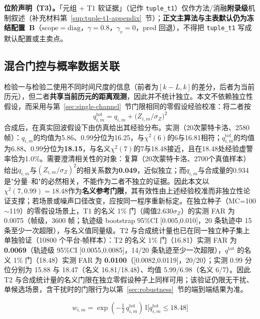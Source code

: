 \documentclass[UTF8,a4paper,zihao=-4]{ctexart}
\begin{document}
\noindent\textbf{位阶声明（T3）。}\quad 「元组 + T1 软证据」（记作 \texttt{tuple\_t1}）仅作方法/消融\textbf{附录级}机制叙述（补充材料第~\ref{sup:tuple-t1-appendix}~节）；\textbf{正文主算法与主表默认仍为冻结配置~B}（$\mathrm{scope}=\mathrm{diag}$，$\gamma=0.8$，$\gamma_v=0$，pred 回退），不得把 \texttt{tuple\_t1} 写成默认配置或主卖点。


\subsection{混合门控与概率数据关联}\label{sec:pda}
检验一与检验二使用不同时间尺度的信息（前者为\([k-L,k]\)的差分，后者为当前历元），但二者\textbf{共享当前历元的距离观测}，因此并不统计独立。本文不依赖独立性假设，而采用与第~\ref{sec:single-channel}~节门限相同的零假设经验校准：将二者按
\begin{equation}
q^{\mathrm{tot}}_{i,m}=q_{i,m}+\bigl(Z_{i,m}/\sigma_Z\bigr)^2
\label{eq:t2-total}
\end{equation}
合成后，在真实回波假设下由仿真给出其经验分布。实测（20次蒙特卡洛、2580帧）：\(q_{i,m}\)的均值为5.86、0.99分位为16.25，与\(\chi^2(6)\)的6与16.81相符；\(q^{\mathrm{tot}}_{i,m}\)的均值为6.88、0.99分位为\textbf{18.15}，与名义\(\chi^2(7)\)的7与18.48接近，且在18.48处经验虚警率恰为1.0\%。需要澄清相关性的对象：复算（20次蒙特卡洛、2700个真值样本）给出\(q_{i,m}\)与\((Z_{i,m}/\sigma_Z)^2\)的相关系数为\textbf{0.049}，近似独立；而\(q_{i,m}\)与合成量的0.934是"分量--和"的必然相关，不能作为二者不独立的证据。因此本文以\(\chi^2(7,0.99)=18.48\)作为\textbf{名义参考门限}，其有效性由上述经验校准而非独立性论证支撑；若场景或噪声口径改变，应按同一程序重新标定。在独立种子（MC=100$\sim$119）的零假设场景上，T1 的名义 1\% 门（阈值$2.630\sigma_Z$）的实测 FAR 为 0.0075（帧级，3600 帧；轨迹级 bootstrap 95\%CI [0.005,0.010]，20 条轨迹中 15 条至少一次超限），与名义值同量级。T2 与合成统计量也已在同一独立种子集上单独验证（10800 个平台-帧样本）：T2 的名义 1\% 门（16.81）实测 FAR 为 \textbf{0.0069}（轨迹级 95\%CI [0.0055,0.0085]，14/20 条轨迹至少一次超限），\(q^{\mathrm{tot}}\) 的名义 1\% 门（18.48）实测 FAR 为 \textbf{0.0100}（[0.0082,0.0119]，20/20）；实测 0.99 分位分别为 15.88 与 18.47（名义 16.81/18.48）、均值 5.99/6.98（名义 6/7）。因此 T2 与合成统计量的名义门限在独立零假设种子上同样可用；该验证仍限无干扰、单候选场景，含干扰时的门限行为以第~\ref{sec:robustness}~节的端到端结果为准。

\begin{equation}
w_{i,m}=\exp\!\left(-\tfrac12\,q^{\mathrm{tot}}_{i,m}\right)\,
\mathbb{I}\bigl[q^{\mathrm{tot}}_{i,m}\le18.48\bigr]
\label{eq:dual-gate}
\end{equation}
\end{document}
